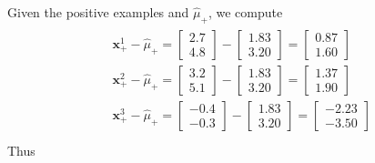 \documentclass[leqno]{article}
\begin{document}
\noindent Given the positive examples and $\hat{\mu}_+$, we compute
\begin{gather*}
\begin{split}
&\textbf{x}_+^1 - \hat{\mu}_+ = 
\begin{bmatrix}
   2.7\\
   4.8 
\end{bmatrix} - 
\begin{bmatrix}
   1.83\\
   3.20 
\end{bmatrix} = 
\begin{bmatrix}
   0.87\\
   1.60 
\end{bmatrix}\\
&\textbf{x}_+^2 - \hat{\mu}_+ = 
\begin{bmatrix}
   3.2\\
   5.1 
\end{bmatrix} - 
\begin{bmatrix}
   1.83\\
   3.20 
\end{bmatrix} = 
\begin{bmatrix}
   1.37\\
   1.90 
\end{bmatrix}\\
&\textbf{x}_+^3 - \hat{\mu}_+ = 
\begin{bmatrix}
   -0.4\\
   -0.3 
\end{bmatrix} - 
\begin{bmatrix}
   1.83\\
   3.20 
\end{bmatrix} = 
\begin{bmatrix}
   -2.23\\
   -3.50 
\end{bmatrix}\\
\end{split}
\end{gather*}
Thus
\end{document}

